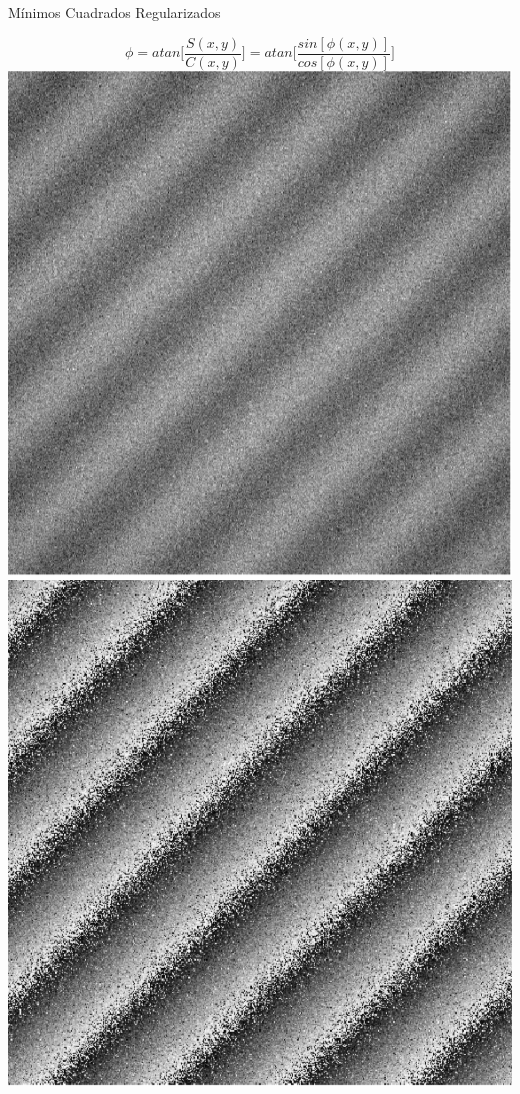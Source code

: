 \documentclass[]{beamer}
\begin{document}
\begin{frame}{M\'inimos Cuadrados Regularizados}
\begin{center}

  \begin{equation}
     \phi=atan\bigg[ \frac{S(x,y)}{C(x,y)} \bigg] = atan\bigg[  \frac{sin[\phi(x,y)]}{cos[\phi(x,y)]}\bigg]
  \end{equation}
\pause \includegraphics[scale=0.25]{Images/InterferogramLS.png} \quad \quad
\pause \includegraphics[scale=0.25]{Images/FaseMinCua.png}

\end{center}
\end{frame}
\end{document}
